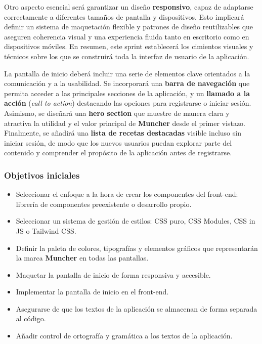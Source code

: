 Otro aspecto esencial será garantizar un diseño \textbf{responsivo}, capaz de
adaptarse correctamente a diferentes tamaños de pantalla y dispositivos. Esto
implicará definir un sistema de maquetación flexible y patrones de diseño
reutilizables que aseguren coherencia visual y una experiencia fluida tanto en
escritorio como en dispositivos móviles. En resumen, este sprint establecerá
los cimientos visuales y técnicos sobre los que se construirá toda la interfaz
de usuario de la aplicación.

La pantalla de inicio deberá incluir una serie de elementos clave orientados a
la comunicación y a la usabilidad. Se incorporará una \textbf{barra de
	navegación} que permita acceder a las principales secciones de la aplicación, y
un \textbf{llamado a la acción} (\textit{call to action}) destacando las
opciones para registrarse o iniciar sesión. Asimismo, se diseñará una
\textbf{hero section} que muestre de manera clara y atractiva la utilidad y el
valor principal de \textbf{Muncher} desde el primer vistazo. Finalmente, se
añadirá una \textbf{lista de recetas destacadas} visible incluso sin iniciar
sesión, de modo que los nuevos usuarios puedan explorar parte del contenido y
comprender el propósito de la aplicación antes de registrarse.

\subsubsection*{Objetivos iniciales}

\begin{itemize}
	\item Seleccionar el enfoque a la hora de crear los componentes del front-end:
	      librería de componentes preexistente o desarrollo propio.
	\item Seleccionar un sistema de gestión de estilos: CSS puro, CSS Modules, CSS in JS
	      o Tailwind CSS.
	\item Definir la paleta de colores, tipografías y elementos gráficos que
	      representarán la marca \textbf{Muncher} en todas las pantallas.
	\item Maquetar la pantalla de inicio de forma responsiva y accesible.
	\item Implementar la pantalla de inicio en el front-end.
	\item Asegurarse de que los textos de la aplicación se almacenan de forma separada al
	      código.
	\item Añadir control de ortografía y gramática a los textos de la aplicación.
\end{itemize}

